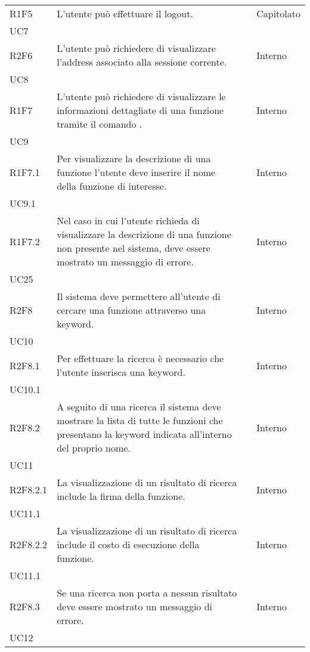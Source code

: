 \begin{longtable}{ 
		>{\centering}p{} 
		>{}p{} 
		>{\centering}p{}
		>{\centering}p{} }
	R1F5 & L'utente può effettuare il logout. 										& \ob & Capitolato \\ UC7 \tabularnewline 
	
	R2F6 & L'utente può richiedere di visualizzare l'address 
			associato alla sessione corrente. 										& \de & Interno \\ UC8 \tabularnewline
	
	R1F7 & L'utente può richiedere di visualizzare le informazioni dettagliate di una funzione
		tramite il comando \info{}.													& \ob & Interno \\ UC9 \tabularnewline
	R1F7.1 & Per visualizzare la descrizione di una funzione l'utente deve inserire 
		il nome della funzione di interesse.											& \ob & Interno \\ UC9.1 \tabularnewline
	R1F7.2 & Nel caso in cui l'utente richieda di visualizzare la descrizione di una 
		funzione non presente nel sistema, deve essere mostrato un messaggio di
		errore.															 			& \ob & Interno \\ UC25 \tabularnewline
	
	R2F8 & Il sistema deve permettere all'utente di cercare una funzione 
		attraverso una keyword. 														& \de & Interno \\ UC10 \tabularnewline
	R2F8.1 & Per effettuare la ricerca è necessario che l'utente inserisca 
		una keyword. 																& \de & Interno \\ UC10.1 \tabularnewline
	R2F8.2 & A seguito di una ricerca il sistema deve mostrare la lista di
	 tutte le funzioni che presentano la keyword indicata 
	 all'interno del proprio nome.													& \de & Interno \\ UC11 \tabularnewline
	R2F8.2.1 & La visualizzazione di un risultato di ricerca include
		 la firma della funzione.													& \de & Interno \\ UC11.1 \tabularnewline
  	R2F8.2.2 & La visualizzazione di un risultato di ricerca include
		  il costo di esecuzione della funzione.										& \de & Interno \\ UC11.1 \tabularnewline
  	R2F8.3 & Se una ricerca non porta a nessun risultato deve essere mostrato un 
		messaggio di errore. 														& \de & Interno \\ UC12 	\tabularnewline	
	

\end{longtable}
